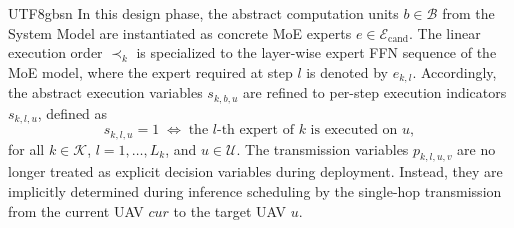 \documentclass[journal]{IEEEtran}
\begin{document}
\begin{CJK*}{UTF8}{gbsn}
In this design phase, the abstract computation units \(b \in \mathcal{B}\) from the System Model are instantiated as concrete MoE experts \(e \in \mathcal{E}_{\mathrm{cand}}\). The linear execution order \(\prec_k\) is specialized to the layer-wise expert FFN sequence of the MoE model, where the expert required at step \(l\) is denoted by \(e_{k,l}\). Accordingly, the abstract execution variables \(s_{k,b,u}\) are refined to per-step execution indicators \(s_{k,l,u}\), defined as
\begin{equation}
s_{k,l,u} = 1 \;\Longleftrightarrow\; \text{the $l$-th expert of $k$ is executed on $u$},
\end{equation}
for all \(k \in \mathcal{K}\), \(l = 1, \dots, L_k\), and \(u \in \mathcal{U}\).
The transmission variables \(p_{k,l,u,v}\) are no longer treated as explicit decision variables during deployment. Instead, they are implicitly determined during inference scheduling by the single-hop transmission from the current UAV \(cur\) to the target UAV \(u\).



\end{CJK*}
\end{document}
